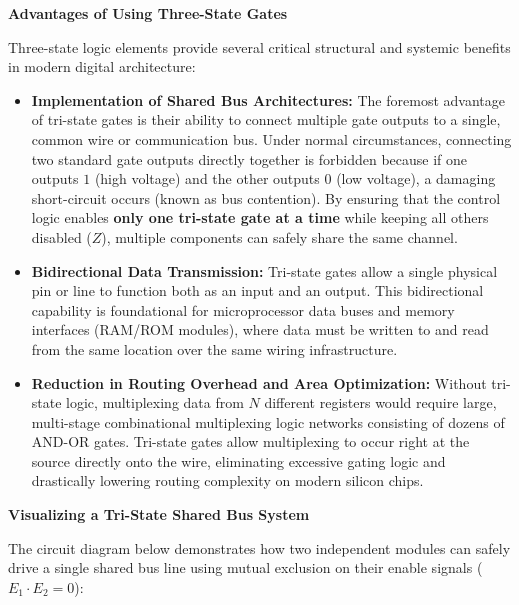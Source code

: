 \documentclass[12pt,a3paper]{article}
\begin{document}
\begin{enumerate}
\begin{tcolorbox}[enhanced,breakable,ansbox,colback=cA!4,colframe=cA,boxrule=0.8pt,arc=5pt,title={\textbf{Answer}},fonttitle=\bfseries\color{white},colbacktitle=cA]
\begin{center}
\end{center}

\vspace{0.4cm}
\textbf{Advantages of Using Three-State Gates}

Three-state logic elements provide several critical structural and systemic benefits in modern digital architecture:

\begin{itemize}
    \item \textbf{Implementation of Shared Bus Architectures:} The foremost advantage of tri-state gates is their ability to connect multiple gate outputs to a single, common wire or communication bus. Under normal circumstances, connecting two standard gate outputs directly together is forbidden because if one outputs $1$ (high voltage) and the other outputs $0$ (low voltage), a damaging short-circuit occurs (known as bus contention). By ensuring that the control logic enables \textbf{only one tri-state gate at a time} while keeping all others disabled ($Z$), multiple components can safely share the same channel.
    
    \item \textbf{Bidirectional Data Transmission:} Tri-state gates allow a single physical pin or line to function both as an input and an output. This bidirectional capability is foundational for microprocessor data buses and memory interfaces (RAM/ROM modules), where data must be written to and read from the same location over the same wiring infrastructure.
    
    \item \textbf{Reduction in Routing Overhead and Area Optimization:} Without tri-state logic, multiplexing data from $N$ different registers would require large, multi-stage combinational multiplexing logic networks consisting of dozens of AND-OR gates. Tri-state gates allow multiplexing to occur right at the source directly onto the wire, eliminating excessive gating logic and drastically lowering routing complexity on modern silicon chips.
\end{itemize}

\vspace{0.3cm}
\textbf{Visualizing a Tri-State Shared Bus System}

The circuit diagram below demonstrates how two independent modules can safely drive a single shared bus line using mutual exclusion on their enable signals ($E_1 \cdot E_2 = 0$):

\begin{center}
\end{center}
\end{tcolorbox}
\end{enumerate}
\end{document}
